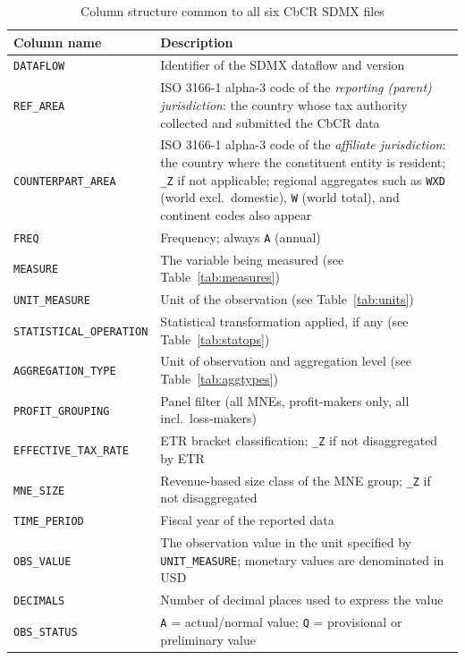 \documentclass[11pt,a4paper]{article}
\newcommand{\code}[1]{\texttt{#1}}
\begin{document}
\begin{table}[H]
\centering
\caption{Column structure common to all six CbCR SDMX files}
\label{tab:columns}
\begin{tabular}{@{}lp{9.5cm}@{}}
\toprule
Column name & Description \\
\midrule
\code{DATAFLOW} & Identifier of the SDMX dataflow and version \\
\code{REF\_AREA} & ISO 3166-1 alpha-3 code of the \emph{reporting (parent) jurisdiction}: the country whose tax authority collected and submitted the CbCR data \\
\code{COUNTERPART\_AREA} & ISO 3166-1 alpha-3 code of the \emph{affiliate jurisdiction}: the country where the constituent entity is resident; \code{\_Z} if not applicable; regional aggregates such as \code{WXD} (world excl.\ domestic), \code{W} (world total), and continent codes also appear \\
\code{FREQ} & Frequency; always \code{A} (annual) \\
\code{MEASURE} & The variable being measured (see Table~\ref{tab:measures}) \\
\code{UNIT\_MEASURE} & Unit of the observation (see Table~\ref{tab:units}) \\
\code{STATISTICAL\_OPERATION} & Statistical transformation applied, if any (see Table~\ref{tab:statops}) \\
\code{AGGREGATION\_TYPE} & Unit of observation and aggregation level (see Table~\ref{tab:aggtypes}) \\
\code{PROFIT\_GROUPING} & Panel filter (all MNEs, profit-makers only, all incl.\ loss-makers) \\
\code{EFFECTIVE\_TAX\_RATE} & ETR bracket classification; \code{\_Z} if not disaggregated by ETR \\
\code{MNE\_SIZE} & Revenue-based size class of the MNE group; \code{\_Z} if not disaggregated \\
\code{TIME\_PERIOD} & Fiscal year of the reported data \\
\code{OBS\_VALUE} & The observation value in the unit specified by \code{UNIT\_MEASURE}; monetary values are denominated in USD \\
\code{DECIMALS} & Number of decimal places used to express the value \\
\code{OBS\_STATUS} & \code{A} = actual/normal value; \code{Q} = provisional or preliminary value \\
\bottomrule
\end{tabular}
\end{table}
\end{document}
